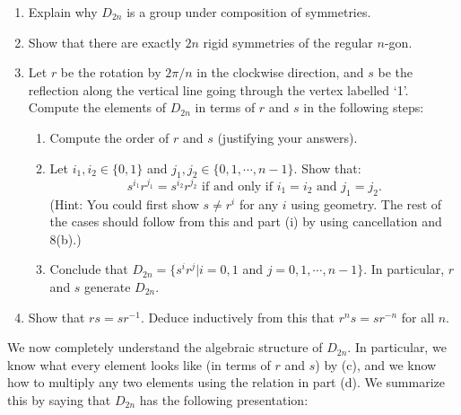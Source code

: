 \documentclass[11pt]{article}
\begin{document}
\begin{enumerate}
{	\begin{center}
   \end{center}
   }
   \begin{enumerate}
     \item{
     Explain why $D_{2n}$ is a group under composition of symmetries.
     }
     \item{
     Show that there are exactly $2n$ rigid symmetries of the regular $n$-gon.
     }
     \item{
     Let $r$ be the rotation by $2\pi/n$ in the clockwise direction, and $s$ be the reflection along the vertical line going through the vertex labelled `1'.  Compute the elements of $D_{2n}$ in terms of $r$ and $s$ in the following steps:
     \begin{enumerate}
       \item{
       Compute the order of $r$ and $s$ (justifying your answers).
       }
       \item{
       Let $i_1,i_2\in\{0,1\}$ and $j_1,j_2\in\{0,1,\cdots,n-1\}$.  Show that:
       \[s^{i_1}r^{j_1}=s^{i_2}r^{j_2}\text{ if and only if }i_1=i_2\text{ and }j_1=j_2.\]
       }
       (Hint: You could first show $s\not=r^i$ for any $i$ using geometry.  The rest of the cases should follow from this and part (i) by using cancellation and 8(b).)
       \item{
       Conclude that $D_{2n} = \{s^ir^j|i=0,1$ and $j=0,1,\cdots,n-1\}$.  In particular, $r$ and $s$ generate $D_{2n}$.
       }
     \end{enumerate}
     }
     \item{
     Show that $rs = sr^{-1}$.  Deduce inductively from this that $r^ns = sr^{-n}$ for all $n$.
     }
   \end{enumerate}
   We now completely understand the algebraic structure of $D_{2n}$.  In particular, we know what every element looks like (in terms of $r$ and $s$) by (c), and we know how to multiply any two elements using the relation in part (d).  We summarize this by saying that $D_{2n}$ has the following presentation:

\end{enumerate}
\end{document}
